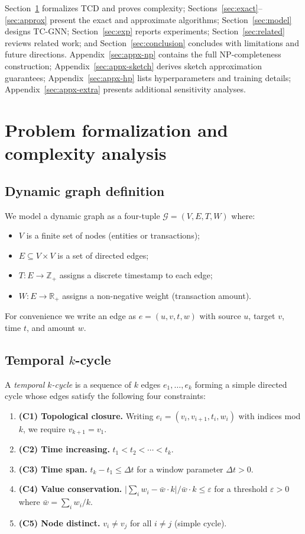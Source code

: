 \documentclass[journal,onecolumn]{IEEEtran}
\newcommand{\R}{\mathbb{R}}
\newcommand{\G}{\mathcal{G}}
\newcommand{\eps}{\varepsilon}
\begin{document}
Section~\ref{sec:theory} formalizes TCD and proves complexity;
Sections~\ref{sec:exact}--\ref{sec:approx} present the exact and approximate
algorithms; Section~\ref{sec:model} designs TC-GNN; Section~\ref{sec:exp}
reports experiments; Section~\ref{sec:related} reviews related work; and
Section~\ref{sec:conclusion} concludes with limitations and future directions.
Appendix~\ref{sec:appx-np} contains the full NP-completeness construction;
Appendix~\ref{sec:appx-sketch} derives sketch approximation guarantees;
Appendix~\ref{sec:appx-hp} lists hyperparameters and training details;
Appendix~\ref{sec:appx-extra} presents additional sensitivity analyses.

\section{Problem formalization and complexity analysis}
\label{sec:theory}

\subsection{Dynamic graph definition}
\label{sec:theory-graph}

We model a dynamic graph as a four-tuple
$\G = (V, E, T, W)$ where:
\begin{itemize}
\item $V$ is a finite set of nodes (entities or transactions);
\item $E \subseteq V \times V$ is a set of directed edges;
\item $T: E \to \mathbb{Z}_{+}$ assigns a discrete timestamp to each edge;
\item $W: E \to \R_{+}$ assigns a non-negative weight (transaction amount).
\end{itemize}
For convenience we write an edge as $e = (u, v, t, w)$ with source $u$,
target $v$, time $t$, and amount $w$.

\subsection{Temporal $k$-cycle}
\label{sec:theory-cycle}

A \emph{temporal $k$-cycle} is a sequence of $k$ edges
$e_1, \dots, e_k$ forming a simple directed cycle whose edges satisfy the
following four constraints:
\begin{enumerate}
\item \textbf{(C1) Topological closure.} Writing $e_i = (v_i, v_{i+1},
t_i, w_i)$ with indices mod $k$, we require $v_{k+1} = v_1$.
\item \textbf{(C2) Time increasing.} $t_1 < t_2 < \cdots < t_k$.
\item \textbf{(C3) Time span.} $t_k - t_1 \leq \Delta t$ for a window
parameter $\Delta t > 0$.
\item \textbf{(C4) Value conservation.}
$\bigl|\sum_i w_i - \bar{w} \cdot k\bigr| / \bar{w} \cdot k \leq \eps$ for
a threshold $\eps > 0$ where $\bar{w} = \sum_i w_i / k$.
\item \textbf{(C5) Node distinct.} $v_i \neq v_j$ for all $i \neq j$
(simple cycle).
\end{enumerate}
\end{document}
